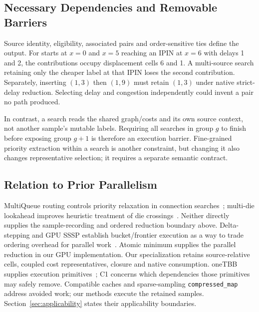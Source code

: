 \subsection{Necessary Dependencies and Removable Barriers}
Source identity, eligibility, associated pairs and order-sensitive ties define the output. For starts at $x=0$ and $x=5$ reaching an IPIN at $x=6$ with delays 1 and 2, the contributions occupy displacement cells 6 and 1. A multi-source search retaining only the cheaper label at that IPIN loses the second contribution. Separately, inserting $(1,3)$ then $(1,9)$ must retain $(1,3)$ under native strict-delay reduction. Selecting delay and congestion independently could invent a pair no path produced.

In contrast, a search reads the shared graph/costs and its own source context, not another sample's mutable labels. Requiring all searches in group $g$ to finish before exposing group $g+1$ is therefore an execution barrier. Fine-grained priority extraction within a search is another constraint, but changing it also changes representative selection; it requires a separate semantic contract.

\subsection{Relation to Prior Parallelism}
MultiQueue routing controls priority relaxation in connection searches~\cite{multiqueue}; multi-die lookahead improves heuristic treatment of die crossings~\cite{multidie}. Neither directly supplies the sample-recording and ordered reduction boundary above. Delta-stepping and GPU SSSP establish bucket/frontier execution as a way to trade ordering overhead for parallel work~\cite{delta,gpu_sssp}. Atomic minimum supplies the parallel reduction in our GPU implementation. Our specialization retains source-relative cells, coupled cost representatives, closure and native consumption. oneTBB supplies execution primitives~\cite{tbb}; C1 concerns which dependencies those primitives may safely remove. Compatible caches and sparse-sampling \texttt{compressed\_map}~\cite{vproptions} address avoided work; our methods execute the retained samples. Section~\ref{sec:applicability} states their applicability boundaries.
